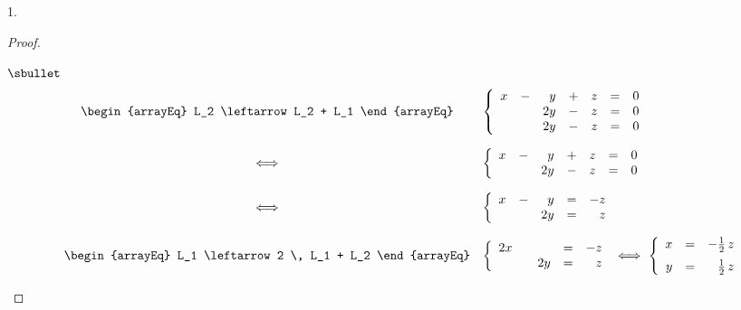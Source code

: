\documentclass[11pt]{article}%
\begin{document}
\begin{noliste}{1.}
\begin{proof}
\begin{noliste}{$\sbullet$}
\[\begin{array}{rcl}
     &
     \begin{arrayEq}
      L_2 \leftarrow L_2 + L_1
     \end{arrayEq}
     &
     \left\{
     \begin{array}{rrrrrcl}
      x & - & y & + & z & = & 0\\
      & & 2y & - & z & = & 0\\
      & & 2y & - & z & = & 0
     \end{array}
     \right.
     \\[.8cm]
     & \Longleftrightarrow &
     \left\{
     \begin{array}{rrrrrcl}
      x & - & y & + & z & = & 0\\
      & & 2y & - & z & = & 0
     \end{array}
     \right.
     \\[.6cm]
     & \Longleftrightarrow & 
     \left\{
     \begin{array}{rrrcr}
      x & - & y & = & -z\\
      & & 2y & = & z
     \end{array}
     \right.
     \\[.6cm]
     &
     \begin{arrayEq}
      L_1 \leftarrow 2 \, L_1 + L_2
     \end{arrayEq}
     &
     \left\{
     \begin{array}{rrrcr}
      2x & & & = & -z\\
      & & 2y & = & z
     \end{array}
     \right.
     \ \Longleftrightarrow \
     \left\{
     \begin{array}{rcr}
       x & = & -\frac{1}{2} \, z\\[.2cm]
       y & = & \frac{1}{2} \, z
     \end{array}
     \right.
    \end{array}
   \]
   




\end{noliste}
\end{proof}
\end{noliste}
\end{document}
